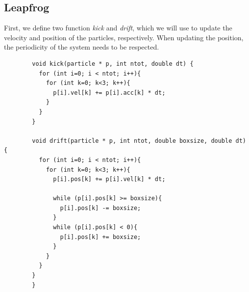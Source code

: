 \subsection{Leapfrog}
    First, we define two function \textit{kick}  and \textit{drift}, which
    we will use to update the velocity and position of the particles, 
    respectively. When updating the position, the periodicity of the system 
    needs to be respected. \\
    \begin{lstlisting}
        void kick(particle * p, int ntot, double dt) {
          for (int i=0; i < ntot; i++){
            for (int k=0; k<3; k++){
              p[i].vel[k] += p[i].acc[k] * dt;
            }
          }
        }
        
        void drift(particle * p, int ntot, double boxsize, double dt) {
          for (int i=0; i < ntot; i++){
            for (int k=0; k<3; k++){
              p[i].pos[k] += p[i].vel[k] * dt;
        
              while (p[i].pos[k] >= boxsize){
                p[i].pos[k] -= boxsize;
              }
              while (p[i].pos[k] < 0){
                p[i].pos[k] += boxsize;
              }
            }
          }
        }
        }\end{lstlisting}

\newpage

